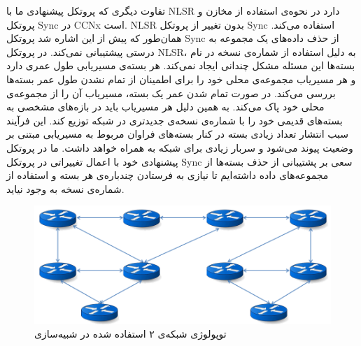 تفاوت دیگری که پروتکل پیشنهادی ما با NLSR دارد در نحوه‌ی استفاده از مخازن و پروتکل Sync در CCNx است. NLSR بدون تغییر از پروتکل Sync استفاده می‌کند. همان‌طور که پیش از این اشاره شد پروتکل Sync از حذف داده‌های یک مجموعه به درستی پیشتیبانی نمی‌کند. در پروتکل NLSR، به دلیل استفاده از شماره‌ی نسخه در نام بسته‌ها این مسئله مشکل چندانی ایجاد نمی‌کند. هر بسته‌ی مسیریابی طول عمری دارد و هر مسیریاب مجموعه‌ی محلی خود را برای اطمینان از تمام نشدن طول عمر بسته‌ها بررسی می‌کند. در صورت تمام شدن عمر یک بسته، مسیریاب آن را از مجموعه‌ی محلی خود پاک می‌کند. به همین دلیل هر مسیریاب باید در بازه‌های مشخصی به بسته‌های قدیمی خود را با شماره‌ی نسخه‌ی جدیدتری در شبکه توزیع کند. این فرآیند سبب انتشار تعداد زیادی بسته در کنار بسته‌های فراوان مربوط به مسیریابی مبتنی بر وضعیت پیوند می‌شود و سربار زیادی برای شبکه به همراه خواهد داشت. ما در پروتکل پیشنهادی خود با اعمال تغییراتی در پروتکل Sync سعی بر پشتیبانی از حذف بسته‌ها از مجموعه‌های داده داشته‌ایم تا نیازی به فرستادن چندباره‌ی هر بسته و استفاده از شماره‌ی نسخه به وجود نیاید.

 \begin{figure}[h!]
\centering
\includegraphics[scale=0.6]{./resources/figures/Network2.png}
\caption{توپولوژی شبکه‌ی ۲ استفاده شده در شبیه‌سازی}
\label{fig:Net2}
\end{figure}

